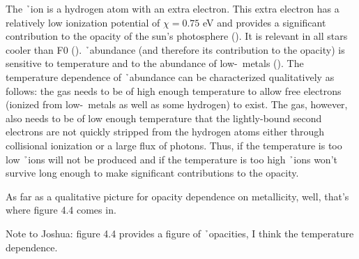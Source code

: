 
The \h\ ion is a hydrogen atom with an extra electron.  This extra electron
has a relatively low ionization potential of $\chi = 0.75$ eV and
provides a significant contribution to the opacity of the sun's
photosphere (\citealt{ryden2010foundations}).  It is relevant in all
stars cooler than F0 (\citealt{carroll2007introduction}). \h\
abundance (and therefore its contribution to the opacity) is sensitive 
to temperature and to the abundance of low-\chii\ metals
(\citealt{hansen1994stellar}).  The temperature dependence of \h\
abundance can be characterized qualitatively as follows: the gas needs
to be of high enough temperature to allow free electrons (ionized from
low-\chii\ metals as well as some hydrogen) to exist.  The gas,
however, also needs to be of low enough temperature that the
lightly-bound second electrons are not quickly stripped from the
hydrogen atoms either through collisional ionization or a large flux
of photons.  Thus, if the temperature is too low \h\ ions will not be
produced and if the temperature is too high \h\ ions won't survive
long enough to make significant contributions to the opacity.

As far as a qualitative picture for opacity dependence on metallicity,
well, that's where figure 4.4 comes in.

Note to Joshua:  \cite{hansen1994stellar} figure 4.4 provides a figure
of \h\ opacities, I think the temperature dependence.
